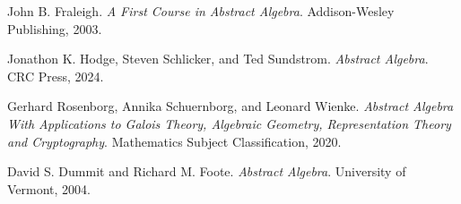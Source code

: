 \documentclass{arabicClass}
\begin{document}
	\abovedisplayskip=7pt
	\belowdisplayskip=7pt
	
	\amirifont
	
	
	
	\arabicfont
	\tableofcontents
	\clearpage
	
	
	
	
	
%	
	
	\begin{thebibliography}{9}
		\begin{english}
		John B. Fraleigh.  
		\textit{A First Course in Abstract Algebra}.  
		Addison-Wesley Publishing, 2003.
		
		Jonathon K. Hodge, Steven Schlicker, and Ted Sundstrom.  
		\textit{Abstract Algebra}.  
		CRC Press, 2024.
		
		Gerhard Rosenborg, Annika Schuernborg, and Leonard Wienke.  
		\textit{Abstract Algebra With Applications to Galois Theory, Algebraic Geometry, Representation Theory and Cryptography}.  
		Mathematics Subject Classification, 2020.
		
		David S. Dummit and Richard M. Foote.  
		\textit{Abstract Algebra}.  
		University of Vermont, 2004.
		\end{english}
		
	\end{thebibliography}
	
\end{document}
